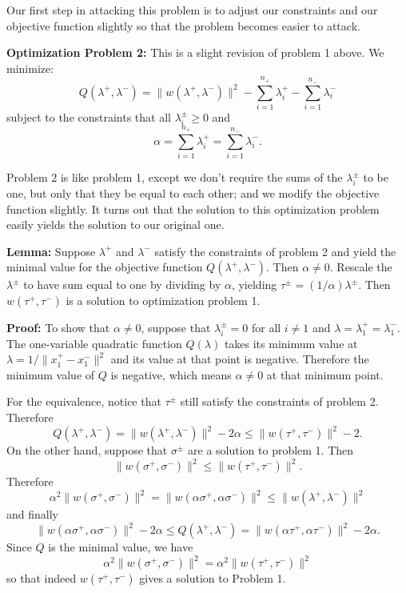\documentclass[
  11pt,
  letterpaper,
]{scrbook}
\theoremstyle{plain}
\theoremstyle{plain}
\theoremstyle{remark}
\begin{document}
Our first step in attacking this problem is to adjust our constraints
and our objective function slightly so that the problem becomes easier
to attack.

\textbf{Optimization Problem 2:} This is a slight revision of problem 1
above. We minimize: \[
Q(\lambda^{+},\lambda^{-}) = \|w(\lambda^{+},\lambda^{-})\|^2-\sum_{i=1}^{n_{+}}\lambda^{+}_{i}-\sum_{i=1}^{n_{-}}\lambda^{-}_{i}
\] subject to the constraints that all \(\lambda^{\pm}_{i}\ge 0\) and \[
\alpha = \sum_{i=1}^{n_{+}}\lambda^+_{i} = \sum_{i=1}^{n_{-}}\lambda^{-}_{i}.
\]

Problem 2 is like problem 1, except we don't require the sums of the
\(\lambda^{\pm}_{i}\) to be one, but only that they be equal to each
other; and we modify the objective function slightly. It turns out that
the solution to this optimization problem easily yields the solution to
our original one.

\textbf{Lemma:} Suppose \(\lambda^{+}\) and \(\lambda^{-}\) satisfy the
constraints of problem 2 and yield the minimal value for the objective
function \(Q(\lambda^{+},\lambda^{-})\). Then \(\alpha\not=0\). Rescale
the \(\lambda^{\pm}\) to have sum equal to one by dividing by
\(\alpha\), yielding \(\tau^{\pm}=(1/\alpha)\lambda^{\pm}\). Then
\(w(\tau^{+},\tau^{-})\) is a solution to optimization problem 1.

\textbf{Proof:} To show that \(\alpha\not=0\), suppose that
\(\lambda^{\pm}_{i}=0\) for all \(i\not=1\) and
\(\lambda=\lambda^{+}_{1}=\lambda^{-}_{1}\). The one-variable quadratic
function \(Q(\lambda)\) takes its minimum value at
\(\lambda=1/\|x_{1}^{+}-x_{1}^{-}\|^2\) and its value at that point is
negative. Therefore the minimum value of \(Q\) is negative, which means
\(\alpha\not=0\) at that minimum point.

For the equivalence, notice that \(\tau^{\pm}\) still satisfy the
constraints of problem 2. Therefore \[
Q(\lambda^{+},\lambda^{-}) = \|w(\lambda^{+},\lambda^{-})\|^2-2\alpha\le \|w(\tau^{+},\tau^{-})\|^2-2.
\] On the other hand, suppose that \(\sigma^{\pm}\) are a solution to
problem 1. Then \[
\|w(\sigma^{+},\sigma^{-})\|^2\le \|w(\tau^{+},\tau^{-})\|^2.
\] Therefore \[
\alpha^2 \|w(\sigma^{+},\sigma^{-})\|^2 = \|w(\alpha\sigma^{+},\alpha\sigma^{-})\|^2\le \|w(\lambda^{+},\lambda^{-})\|^2
\] and finally \[
\|w(\alpha\sigma^{+},\alpha\sigma^{-})\|^2-2\alpha\le Q(\lambda^{+},\lambda^{-})=\|w(\alpha\tau^{+},\alpha\tau^{-})\|^2-2\alpha.
\] Since \(Q\) is the minimal value, we have \[
\alpha^{2}\|w(\sigma^{+},\sigma^{-})\|^2 = \alpha^{2}\|w(\tau^{+},\tau^{-})\|^2
\] so that indeed \(w(\tau^{+},\tau^{-})\) gives a solution to Problem
1.
\end{document}
